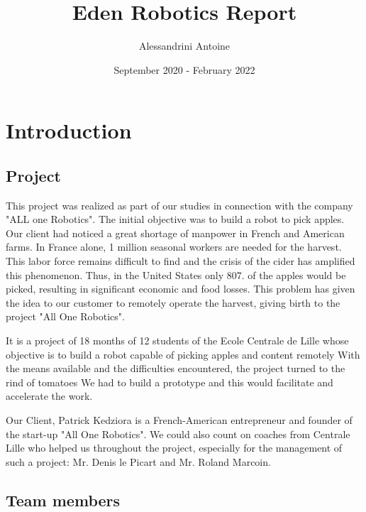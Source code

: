 \documentclass[oneside]{book}
\title{Eden Robotics Report}
\author{Alessandrini Antoine}
\date{September 2020 - February 2022}
\begin{document}
\maketitle
\tableofcontents
\listoffigures

\newpage
\chapter*{Introduction}

\section*{Project}

\hspace{\parindent} This project was realized as part of our studies in connection with the company "ALL one Robotics". The initial objective was to build a robot to pick apples. Our client had noticed a great shortage of manpower in French and American farms. In France alone, 1 million seasonal workers are needed for the harvest. This labor force remains difficult to find and the crisis of the cider has amplified this phenomenon. Thus, in the United States only 807. of the apples would be picked, resulting in significant economic and food losses. This problem has given the idea to our customer to remotely operate the harvest, giving birth to the project "All One Robotics". 

\bigbreak

It is a project of 18 months of 12 students of the Ecole Centrale de Lille whose objective is to build a robot capable of picking apples and content remotely With the means available and the difficulties encountered, the project turned to the rind of tomatoes We had to build a prototype and this would facilitate and accelerate the work.

\bigbreak

Our Client, Patrick Kedziora is a French-American entrepreneur and founder of the start-up "All One Robotics". We could also count on coaches from Centrale Lille who helped us throughout the project, especially for the management of such a project: Mr. Denis le Picart and Mr. Roland Marcoin. 

\section*{Team members}
\end{document}
